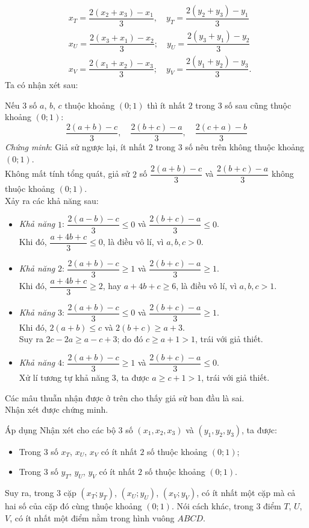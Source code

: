 \begin{bt}
{	{\allowdisplaybreaks
		\begin{align*}
	&x_T=\dfrac{2(x_2+x_3)-x_1}{3},\quad y_T=\dfrac{2(y_2+y_3)-y_1}{3}\\
	&x_U=\dfrac{2(x_3+x_1)-x_2}{3};\quad y_U=\dfrac{2(y_3+y_1)-y_2}{3}\\
	&x_V=\dfrac{2(x_1+x_2)-x_3}{3};\quad y_V=\dfrac{2(y_1+y_2)-y_3}{3}.
	\end{align*}}Ta có nhận xét sau:
	\begin{nx}
		Nếu $3$ số $a$, $b$, $c$ thuộc khoảng $(0;1)$ thì ít nhất $2$ trong $3$ số sau cũng thuộc khoảng $(0;1)$:
		\[\dfrac{2(a+b)-c}{3},\quad \dfrac{2(b+c)-a}{3},\quad \dfrac{2(c+a)-b}{3}\]
		\textit{Chứng minh}: Giả sử ngược lại, ít nhất $2$ trong $3$ số nêu trên không thuộc khoảng $(0;1)$.\\
		Không mất tính tổng quát, giả sử $2$ số $\dfrac{2(a+b)-c}{3}$ và $\dfrac{2(b+c)-a}{3}$ không thuộc khoảng $(0;1)$.\\
		Xảy ra các khả năng sau:
		\begin{itemize}
			\item \textit{Khả năng} $1$: $\dfrac{2(a-b)-c}{3}\leq0$ và $\dfrac{2(b+c)-a}{3}\leq 0$.\\
			Khi đó, $\dfrac{a+4b+c}{3} \leq0$, là điều vô lí, vì $a,b,c>0$.
			\item \textit{Khả năng} $2$: $\dfrac{2(a+b)-c}{3}\geq1$ và $\dfrac{2(b+c)-a}{3}\geq1$.\\
			Khi đó, $\dfrac{a+4b+c}{3}\geq2$, hay $a+4b+c\geq6$, là điều vô lí, vì $a,b,c>1$.
			\item \textit{Khả năng} $3$: $\dfrac{2(a+b)-c}{3}\leq0$ và $\dfrac{2(b+c)-a}{3}\geq1$.\\
			Khi đó, $2(a+b)\leq c$ và $2(b+c)\geq a+3$.\\
			Suy ra $2c-2a\geq a-c+3$; do đó $c\geq a+1>1$, trái với giả thiết.
			\item \textit{Khả năng} $4$: $\dfrac{2(a+b)-c}{3}\geq 1$ và $\dfrac{2(b+c)-a}{3}\leq0$.\\
			Xử lí tương tự khả năng $3$, ta được $a\geq c+1>1$, trái với giả thiết.
		\end{itemize}
	Các mâu thuẫn nhận được ở trên cho thấy giả sử ban đầu là sai.\\
	Nhận xét được chứng minh.
	\end{nx}
	Áp dụng Nhận xét cho các bộ $3$ số $(x_1,x_2,x_3)$ và $(y_1,y_2,y_3)$, ta được:
	\begin{itemize}
		\item Trong $3$ số $x_T$, $x_U$, $x_V$ có ít nhất $2$ số thuộc khoảng $(0;1)$;
		\item Trong $3$ số $y_T$, $y_U$, $y_V$ có ít nhất $2$ số thuộc khoảng $(0;1)$.
	\end{itemize}
	Suy ra, trong $3$ cặp $(x_T;y_T)$, $(x_U;y_U)$, $(x_V;y_V)$, có ít nhất một cặp mà cả hai số của cặp đó cùng thuộc khoảng $(0;1)$. Nói cách khác, trong $3$ điểm $T$, $U$, $V$, có ít nhất một điểm nằm trong hình vuông $ABCD$.}
\end{bt}

